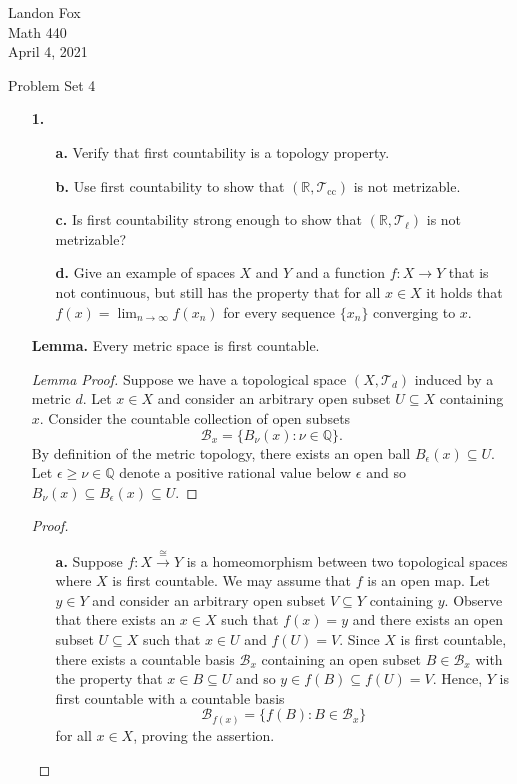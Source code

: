 \documentclass[ 12pt ]{article}
\begin{document}
\noindent Landon Fox \\
\noindent Math 440 \\
\noindent April 4, 2021

\begin{center}
	\Large Problem Set 4
\end{center}

\begin{enumerate}
	\item[\textbf{1.}] $ $
		\begin{enumerate}
			\item[\textbf{a.}] Verify that first countability is a topology property.
			\item[\textbf{b.}] Use first countability to show that $(\mathbb{R}, \mathcal{T}_\mathrm{cc})$ is not metrizable.
			\item[\textbf{c.}] Is first countability strong enough to show that $(\mathbb{R}, \mathcal{T}_\ell)$ is not metrizable?
			\item[\textbf{d.}] Give an example of spaces $X$ and $Y$ and a function $f : X \to Y$ that is not continuous, but still has the property that for all $x \in X$ it holds that
				$f(x) = \lim_{n \to \infty} f(x_n)$ for every sequence $\{ x_n \}$ converging to $x$.
		\end{enumerate}

		\textbf{Lemma.} Every metric space is first countable.
		\begin{proof}[Lemma Proof]
			Suppose we have a topological space $(X, \mathcal{T}_d)$ induced by a metric $d$. Let $x \in X$ and consider an arbitrary open subset $U \subseteq X$ containing
			$x$. Consider the countable collection of open subsets $$\mathcal{B}_x = \{ B_\nu(x) : \nu \in \mathbb{Q} \}.$$ By definition of the metric topology, there exists an open
			ball $B_\epsilon(x) \subseteq U$. Let $\epsilon \geq \nu \in \mathbb{Q}$ denote a positive rational value below $\epsilon$ and so $B_\nu(x) \subseteq B_\epsilon(x) \subseteq
			U$.
		\end{proof}

		\begin{proof} $ $
			\begin{enumerate}
				\item[\textbf{a.}] Suppose $f : X \overset{\cong}{\to} Y$ is a homeomorphism between two topological spaces where $X$ is first countable. We may assume that $f$ is an
					open map. Let $y \in Y$ and consider an arbitrary open subset $V \subseteq Y$ containing $y$. Observe that there exists an $x \in X$ such that $f(x) = y$ and there
					exists an open subset $U \subseteq X$ such that $x \in U$ and $f(U) = V$. Since $X$ is first countable, there exists a countable basis $\mathcal{B}_x$ containing an
					open subset $B \in \mathcal{B}_x$ with the property that $x \in B \subseteq U$ and so $y \in f(B) \subseteq f(U) = V$. Hence, $Y$ is first countable with a countable
					basis $$\mathcal{B}_{f(x)} = \{ f(B) : B \in \mathcal{B}_x \}$$ for all $x \in X$, proving the assertion.


\end{enumerate}
\end{proof}
\end{enumerate}
\end{document}
